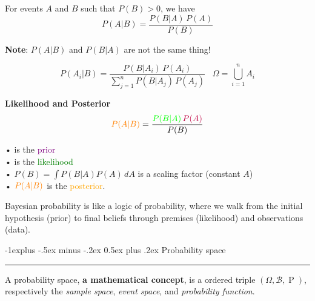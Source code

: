 \documentclass[letterpaper, 10.5pt,landscape]{article}
\makeatletter
\def\mathcolor#1#{\@mathcolor{#1}}
\def\@mathcolor#1#2#3{%
  \protect\leavevmode
  \begingroup
    \color#1{#2}#3%
  \endgroup
}
\renewcommand{\subsection}{\@startsection{subsection}{2}{0mm}%
                                {-1explus -.5ex minus -.2ex}%
                                {0.5ex plus .2ex}%
                                {\normalfont\normalsize\bfseries}}
\makeatother
\begin{document}
\begin{multicols*}{3}
For events $A$ and $B$ such that $P(B)>0$, we have
\vspace{-3pt}
\[\boxed{P(A|B) = \frac{P(B|A) \hspace{2pt} P(A)}  {P(B)}}  \]

\textbf{Note}: $P(A|B)$ and $P(B|A)$ are not the same thing!
\vspace{-5pt}

\[\boxed{P(A_{i}|B) = \frac{P(B|A_{i}) \hspace{2pt}
P(A_{i})}{\sum_{j=1}^{n}P(B|A_{j}) \hspace{2pt} P(A_{j})}}  \hspace{10pt} \boxed{\Omega = \bigcup \limits_{i=1}^{n} A_{i}} \]



\textbf{Likelihood and Posterior} 
\vspace{-5pt}
\[\mathcolor{orange}{P(A|B)} = \frac{\mathcolor{green}{P(B|A)} \, \mathcolor{purple}{P(A)}} {P(B)} \]
\vspace{-10pt}

•  is the \textcolor{purple}{prior}
\\
•  is the \textcolor{green}{likelihood}  \\
• $P(B) = \int P(B|A) P(A) \hspace{2pt} dA $ is a scaling factor (constant $A$) \\
• $\mathcolor{orange}{P(A|B)}$ is the \textcolor{orange}{posterior}.




Bayesian probability is like a logic of probability, where we walk from the initial hypothesis (prior) to final beliefs through premises (likelihood) and observations (data).


















\subsection{Probability space} {\color{teal}\hrule height 0.5pt} \smallskip

A probability space, \textbf{a mathematical concept}, is a ordered triple \((\Omega,\mathcal{B}, \mathrel{P})\), respectively the \textit{sample space}, \textit{event space}, and \textit{probability function}. \\




\end{multicols*}
\end{document}
